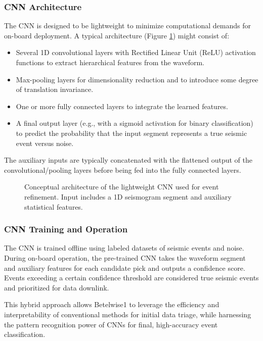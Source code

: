 \documentclass[11pt,a4paper]{article}
\begin{document}
\subsubsection{CNN Architecture}
The CNN is designed to be lightweight to minimize computational demands for on-board deployment. A typical architecture (Figure \ref{fig:cnn_architecture}) might consist of:
\begin{itemize}
    \item Several 1D convolutional layers with Rectified Linear Unit (ReLU) activation functions to extract hierarchical features from the waveform.
    \item Max-pooling layers for dimensionality reduction and to introduce some degree of translation invariance.
    \item One or more fully connected layers to integrate the learned features.
    \item A final output layer (e.g., with a sigmoid activation for binary classification) to predict the probability that the input segment represents a true seismic event versus noise.
\end{itemize}
The auxiliary inputs are typically concatenated with the flattened output of the convolutional/pooling layers before being fed into the fully connected layers.

\begin{figure}[H]
    \centering
    \caption{Conceptual architecture of the lightweight CNN used for event refinement. Input includes a 1D seismogram segment and auxiliary statistical features.}
    \label{fig:cnn_architecture}
\end{figure}

\subsubsection{CNN Training and Operation}
The CNN is trained offline using labeled datasets of seismic events and noise. During on-board operation, the pre-trained CNN takes the waveform segment and auxiliary features for each candidate pick and outputs a confidence score. Events exceeding a certain confidence threshold are considered true seismic events and prioritized for data downlink.

This hybrid approach allows Betelwise1 to leverage the efficiency and interpretability of conventional methods for initial data triage, while harnessing the pattern recognition power of CNNs for final, high-accuracy event classification.
\end{document}
